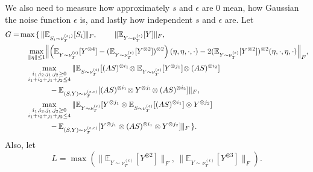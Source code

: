 \documentclass{article} %
\newcommand{\E}{\mathbb{E}}
\theoremstyle{definition}
\begin{document}
We also need to measure how approximately $s$ and $\epsilon$ are 0 mean, how Gaussian the noise function $\epsilon$ is, and lastly how independent $s$ and $\epsilon$ are. Let 
\begin{align*}
G = &  \max \Huge{\{} \, \| \E_{S_i\sim \nu_T^{(s_i)}} [S_i] \|_F,\quad \| \E_{Y \sim \nu_T^{(\epsilon)}} [Y] \|_F, \\
& \quad  \max_{\|\eta\| \le 1} \Bigl\| \left(\E_{Y\sim \nu_T^{(\epsilon)}} [Y^{\otimes4}] - (\E_{Y\sim \nu_T^{(\epsilon)}} [Y^{\otimes2}])^{\otimes 2}\right)(\eta,\eta,\cdot,\cdot)  - 2 (\E_{Y\sim \nu_T^{(\epsilon)}} [Y^{\otimes2}])^{\otimes 2}(\eta,\cdot,\eta,\cdot)\Bigr\|_F, \\
& \quad \max_{
	\substack{i_1,i_2,j_1,j_2 \ge 0 \\ i_1+i_2+j_1+j_2 \le 4}}
 \| \E_{S\sim \nu_T^{(s)}} [(AS)^{\otimes i_1}\!\otimes \E_{Y\sim \nu_T^{(\epsilon)}} [Y^{\otimes j_1}] \!\otimes (AS)^{\otimes i_2}] \\
& \quad \quad \quad \quad - \E_{(S, Y)\sim \nu_T^{(s, \epsilon)}} [(AS)^{\otimes i_1}\!\otimes Y^{\otimes j_1}\!\otimes (AS)^{\otimes i_2}]  \|_F, \\
& \quad \max_{
	\substack{i_1,i_2,j_1,j_2 \ge 0 \\ i_1+i_2+j_1+j_2 \le 4}}
\| \E_{Y\sim \nu_T^{(\epsilon)}} [Y^{\otimes j_1} \otimes \E_{S\sim \nu_T^{(s)}} [(AS)^{\otimes i_1}] \otimes Y^{\otimes j_2}] \\
& \quad \quad \quad \quad - \E_{(S, Y)\sim \nu_T^{(s, \epsilon)}} [ Y^{\otimes j_1}\otimes (AS)^{\otimes i_1}\otimes Y^{\otimes j_2}] \|_F \, \Huge{\}}.
\end{align*}
Also, let 
\[
L = \max \left( \| \E_{Y\sim \nu_T^{(\epsilon)}} [Y^{\otimes 2}] \|_F,\, \| \E_{Y\sim \nu_T^{(\epsilon)}} [Y^{\otimes 3}] \|_F \right).
\]
\end{document}
